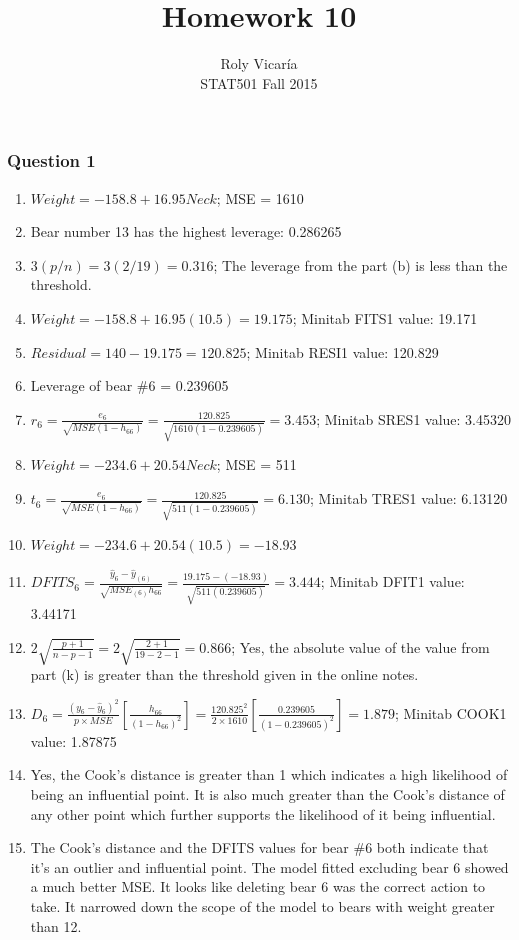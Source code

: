 \documentclass{article}
\title{Homework 10}
\author{Roly Vicar\'ia \\ STAT501 Fall 2015}
\begin{document}
    
    
    \maketitle
    
    

    
    \subsubsection{Question 1}\label{question-1}

\begin{enumerate}
\def\labelenumi{\alph{enumi})}
\item
  \(Weight = -158.8 + 16.95 Neck\); MSE = 1610
\item
  Bear number 13 has the highest leverage: 0.286265
\item
  \(3(p/n) = 3(2/19) = 0.316\); The leverage from the part (b) is less
  than the threshold.
\item
  \(Weight = -158.8 + 16.95 (10.5) = 19.175\); Minitab FITS1 value:
  19.171
\item
  \(Residual = 140 - 19.175 = 120.825\); Minitab RESI1 value: 120.829
\item
  Leverage of bear \#6 = 0.239605
\item
  \(r_6 = \frac{e_6}{\sqrt{MSE (1 - h_{66})}} = \frac{120.825}{\sqrt{1610 (1 - 0.239605)}} = 3.453\);
  Minitab SRES1 value: 3.45320
\item
  \(Weight = -234.6 + 20.54 Neck\); MSE = 511
\item
  \(t_6 = \frac{e_6}{\sqrt{MSE (1 - h_{66})}} = \frac{120.825}{\sqrt{511 (1 - 0.239605)}} = 6.130\);
  Minitab TRES1 value: 6.13120
\item
  \(Weight = -234.6 + 20.54 (10.5) = -18.93\)
\item
  \(DFITS_6 = \frac{\hat{y}_6 - \hat{y}_{(6)}}{\sqrt{MSE_{(6)}h_{66}}} = \frac{19.175 - (-18.93)}{\sqrt{511 (0.239605)}} = 3.444\);
  Minitab DFIT1 value: 3.44171
\item
  \(2\sqrt{\frac{p + 1}{n - p - 1}} = 2\sqrt{\frac{2 + 1}{19 - 2 - 1}} = 0.866\);
  Yes, the absolute value of the value from part (k) is greater than the
  threshold given in the online notes.
\item
  \(D_6 = \frac{(y_6 - \hat{y}_6)^2}{p \times MSE} \left[\frac{h_{66}}{(1 - h_{66})^2}\right] = \frac{120.825^2}{2 \times 1610} \left[\frac{0.239605}{(1 - 0.239605)^2}\right] = 1.879\);
  Minitab COOK1 value: 1.87875
\item
  Yes, the Cook's distance is greater than 1 which indicates a high
  likelihood of being an influential point. It is also much greater than
  the Cook's distance of any other point which further supports the
  likelihood of it being influential.
  \newpage
\item
  The Cook's distance and the DFITS values for bear \#6 both indicate
  that it's an outlier and influential point. The model fitted excluding
  bear 6 showed a much better MSE. It looks like deleting bear 6 was the
  correct action to take. It narrowed down the scope of the model to
  bears with weight greater than 12.
  

\end{enumerate}
\end{document}
